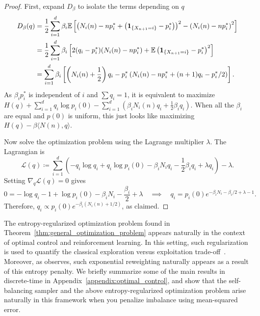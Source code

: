 \begin{proof}
    First, expand $D_\beta$ to isolate the terms depending on $q$
    \begin{align*}
        D_\beta(q) &= \frac{1}{2} \sum_{i=1}^d \beta_i \mathbb{E} \left[\left(N_i(n) - np_i^* + \left(\mathbf 1_{\{X_{n+1} = i\}} - p_i^*\right)\right)^2 - \left(N_i(n) - np_i^*\right)^2 \right]\\
             & = \frac{1}{2} \sum_{i=1}^d \beta_i \left[2(q_i - p_i^*)(N_i(n) - np_i^*) + \mathbb{E} \left(\mathbf 1_{\{X_{n+1} = i\}} - p_i^*\right)^2\right]\\
             & = \sum_{i=1}^d \beta_i \left[\left( N_i(n) + \frac{1}{2}\right) q_i - p_i^* \left(N_i(n) - np_i^* + (n+1)q_i - p_i^*/2\right)\right].
    \end{align*}
    As $\beta_ip_i^*$ is independent of $i$ and $\sum q_i = 1$, it is equivalent to maximize $H(q) + \sum_{i=1}^d q_i\log p_i(0) - \sum_{i=1}^d \left(\beta_i N_i(n) q_i + \frac{1}{2} \beta_iq_i\right)$. 
    When all the $\beta_i$ are equal and $p(0)$ is uniform, this just looks like maximizing $H(q) - \beta \langle N(n),q \rangle$.

    Now solve the optimization problem using the Lagrange multiplier $\lambda$. The Lagrangian is
    $$\mathcal L(q) \coloneqq \sum_{i=1}^d \left(- q_i \log q_i + q_i \log p_i(0) - \beta_i N_i q_i - \frac{1}{2} \beta_i q_i + \lambda q_i \right) - \lambda.$$
    Setting $\nabla_q \mathcal L(q) = 0$ gives
    $$0 = -\log q_i - 1 + \log p_i(0) - \beta_i N_i - \frac{\beta_i}{2} + \lambda \quad \implies \quad q_i = p_i(0)e^{-\beta_i N_i - \beta_i/2 + \lambda - 1}.$$
    Therefore, $q_i \propto p_i(0)e^{-\beta_i (N_i(n)+1/2)}$, as claimed.
\end{proof}

The entropy-regularized optimization problem found in
Theorem~\ref{thm:general_optimization_problem} appears naturally in the context of
optimal control and reinforcement learning. In this setting, such regularization is used
to quantify the classical exploration versus exploitation trade-off~\cite{so2022_maximum_entropy_differential_dynamic_programming_arxiv, wang2020_reinforcement_learning_stochastic_control, haarnoja2018_soft_actor_critic_arxiv}.
Moreover, as \cite{todorov2006_linearly_solvable_mdp} observes, such exponential reweighting naturally appears
as a result of this entropy penalty. We briefly summarize some of the main results in discrete-time
in Appendix~\ref{appendix:optimal_control}, and show that the self-balancing sampler
and the above entropy-regularized optimization problem arise naturally in this
framework when you penalize imbalance using mean-squared error.

